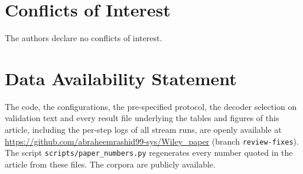 \section*{Conflicts of Interest}
The authors declare no conflicts of interest.

\section*{Data Availability Statement}
{\sloppy
The code, the configurations, the pre-specified protocol, the decoder selection on validation text and every result file underlying the tables and figures of this article, including the per-step logs of all stream runs, are openly available at \url{https://github.com/abraheemrashid99-sys/Wiley_paper} (branch \texttt{review-fixes}). The script \texttt{scripts/paper\_numbers.py} regenerates every number quoted in the article from these files. The corpora are publicly available.\par}
